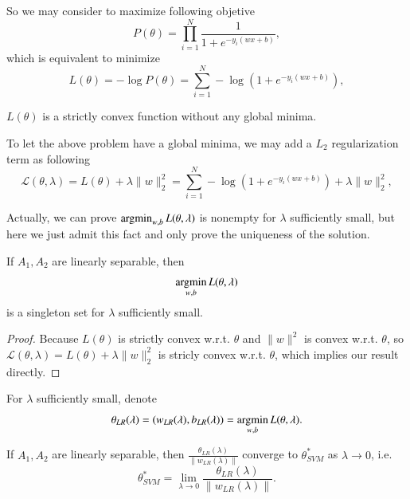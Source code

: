 So we may consider to maximize following objetive
\begin{equation}
	P(\theta) = \prod_{i = 1}^N \frac{1}{1+ e^{-y_i(wx+b)}},\end{equation}
which is equivalent to minimize
\begin{equation}
L(\theta) = -\log P(\theta) = \sum_{i = 1}^N -\log(1+ e^{-y_i(wx+b)}),
\end{equation}

\begin{lemma}
	$L(\theta)$ is a strictly convex function without any global minima. 
\end{lemma}

To let the above problem have a global minima, we may add a $L_2$ regularization term as following
\begin{equation}
	\mathcal L(\theta,\lambda)  = L(\theta) + \lambda \|w\|_2^2 = \sum_{i = 1}^N -\log(1+ e^{-y_i(wx+b)}) + \lambda \|w\|_2^2,
\end{equation}

Actually, {we can prove $\mathop{\rm argmin}_{w,b} L(\theta,\lambda)$ is nonempty for $\lambda $ sufficiently small, but here we just admit this fact and only prove the uniqueness of the solution.}

\begin{lemma}
		If $A_1,A_2$ are linearly separable, then
	\begin{equation}\label{binaryLR}
	\mathop{\rm argmin}_{w,b} L(\theta,\lambda)
	\end{equation}
	is a singleton set for $\lambda $ sufficiently small.
\end{lemma}

\begin{proof}
Because $L(\theta)$ is strictly convex w.r.t. $\theta$ and $\|w\|^2$ is convex w.r.t. $\theta$, so $\mathcal L(\theta,\lambda)  = L(\theta) + \lambda \|w\|_2^2$ is stricly convex w.r.t. $\theta$, which implies our result directly.

\end{proof}

For $\lambda$ sufficiently small, denote
\begin{equation}
	\theta_{LR}(\lambda) = (w_{LR}(\lambda),b_{LR}(\lambda)) = \mathop{\rm argmin}_{w,b} L(\theta,\lambda).
\end{equation}


\begin{theorem}
	If $A_1,A_2$ are linearly separable, then $\frac{\theta_{LR}(\lambda)}{\|w_{LR}(\lambda)\|}$ converge to $\theta^*_{SVM}$ as $\lambda \rightarrow 0$, i.e.
	\begin{equation}
		\theta^*_{SVM} = \lim_{\lambda\rightarrow 0} \frac{\theta_{LR}(\lambda)}{\|w_{LR}(\lambda)\|}.
	\end{equation}
\end{theorem}